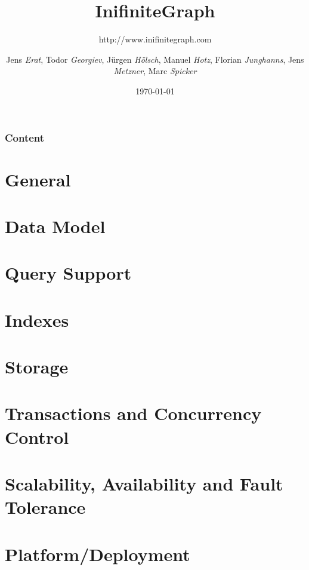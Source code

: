 \documentclass{beamer}
\title[InifiniteGraph]{\textsf{InifiniteGraph}}
\subtitle{http://www.inifinitegraph.com}
\author[JE,TG,JH,MH,FJ,JM,MS]{Jens \textit{Erat},
Todor \textit{Georgiev},
J\"{u}rgen \textit{H\"{o}lsch},
Manuel \textit{Hotz},
Florian \textit{Junghanns},
Jens \textit{Metzner},
Marc \textit{Spicker}}
\institute[]{Universität Konstanz}
\date{\today}
\begin{document}
\begin{frame}
\titlepage
\end{frame} 


\begin{frame}
\frametitle{Content}
\tableofcontents
\end{frame} 


\section{General}


\section{Data Model}


\section{Query Support}


\section{Indexes}


\section{Storage}


\section{Transactions and Concurrency Control}


\section{Scalability, Availability and Fault Tolerance}


\section{Platform/Deployment}

\end{document}

